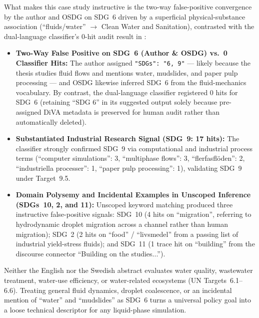 \begin{casestudySection}
What makes this case study instructive is the two-way false-positive convergence by the author and OSDG on \gls{SDG}~6 driven by a superficial physical-substance association (\enquote{fluids/water} $\rightarrow$ Clean Water and Sanitation), contrasted with the dual-language classifier's \num{0}-hit audit result in :
\begin{itemize}
    \item \textbf{Two-Way False Positive on \gls{SDG}~6 (Author \& OSDG) vs.\ \num{0} Classifier Hits:} The author assigned \texttt{"SDGs": "6, 9"} --- likely because the thesis studies fluid flows and mentions water, mudslides, and paper pulp processing --- and OSDG likewise inferred \gls{SDG}~6 from the fluid-mechanics vocabulary. By contrast, the dual-language classifier registered \num{0} hits for \gls{SDG}~6 (retaining \enquote{SDG 6} in its suggested output solely because pre-assigned \gls{DiVA} metadata is preserved for human audit rather than automatically deleted).

    \item \textbf{Substantiated Industrial Research Signal (\gls{SDG}~9: \num{17} hits):} The classifier strongly confirmed \gls{SDG}~9 via computational and industrial process terms (\enquote{computer simulations}: 3, \enquote{multiphase flows}: 3, \enquote{\foreignlanguage{swedish}{flerfasflöden}}: 2, \enquote{\foreignlanguage{swedish}{industriella processer}}: 1, \enquote{paper pulp processing}: 1), validating \gls{SDG}~9 under Target~9.5.

    \item \textbf{Domain Polysemy and Incidental Examples in Unscoped Inference (\glspl{SDG}~10, 2, and 11):} Unscoped keyword matching produced three instructive false-positive signals: \gls{SDG}~10 (\num{4} hits on \enquote{migration}, referring to hydrodynamic droplet migration across a channel rather than human migration); \gls{SDG}~2 (\num{2} hits on \enquote{food} / \enquote{\foreignlanguage{swedish}{livsmedel}} from a passing list of industrial yield-stress fluids); and \gls{SDG}~11 (\num{1} trace hit on \enquote{building} from the discourse connector \enquote{Building on the studies...}).
\end{itemize}

Neither the English nor the Swedish abstract evaluates water quality, wastewater treatment, water-use efficiency, or water-related ecosystems (UN Targets~6.1--6.6). Treating general fluid dynamics, droplet coalescence, or an incidental mention of \enquote{water} and \enquote{mudslides} as \gls{SDG}~6 turns a universal policy goal into a loose technical descriptor for any liquid-phase simulation.
\end{casestudySection}

